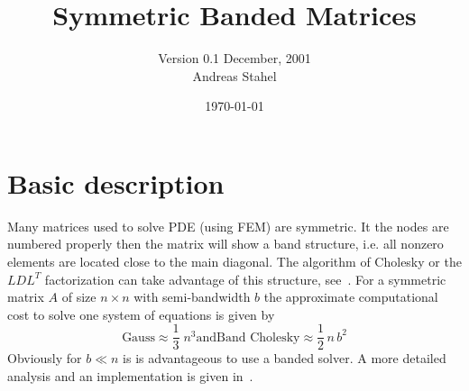 \documentclass[11pt]{article}
\title{Symmetric Banded Matrices}
\author{Version 0.1 December, 2001\\
Andreas Stahel
}
\date{\today}
\begin{document}
\newcommand{\currdir}{./}

\maketitle
%

\def\currdir{./}
\newcommand\ID[1]{\index{#1}}
\setlength{\marginparwidth}{25mm}



\newcommand\DF[1]{$^*$\marginpar{#1}}


\tableofcontents




\section{Basic description}
Many  matrices used to solve PDE (using FEM) are symmetric. It the
nodes are numbered properly then the matrix will show
a band structure, i.e. all nonzero elements are located close to the main
diagonal. The algorithm of Cholesky or the $LDL^T$ factorization can take
advantage of this structure, see~\cite{GoluVanLoan96}. For a symmetric
matrix $A$ of size $n\times n$ with semi-bandwidth $b$ the approximate
computational cost to solve one system of equations is 
given by
\[ \mbox{Gauss}\approx \frac{1}{3}\;n^3 \text{and}
 \mbox{Band Cholesky}\approx \frac{1}{2}\,n\,b^2\]
Obviously for $b\ll n$ is is advantageous to
use a banded solver. A more detailed analysis and an implementation is
given in~\cite{VarFem}.
\end{document}
